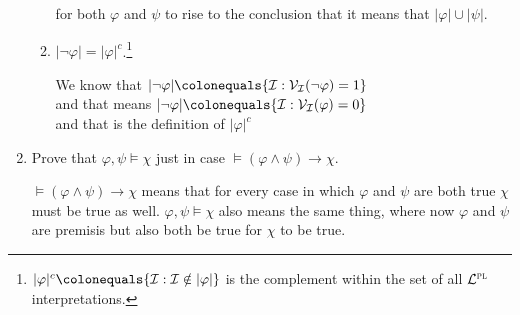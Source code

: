 \documentclass[12pt]{article}
\renewcommand{\vert}[1]{\lvert#1\rvert}
\newcommand{\set}[1]{\lbrace#1\rbrace} %
\newcommand{\I}{\mathcal{I}} %
\newcommand{\PL}{\mathcal{L}^{\textsc{pl}}} %
\newcommand{\V}[1]{\mathcal{V}_{#1}} %
\newcommand{\answer}[1]{%
  \par\noindent
  \begin{tcolorbox}[colback=gray!10, colframe=gray!80, title=Proof]
    #1
  \end{tcolorbox}
}
\begin{document}
\begin{enumerate}
\begin{enumerate}
{          for both $\varphi$ and $\psi$ to rise to the conclusion that it means that $\vert{\varphi} \cup \vert{\psi}$.
        }
      \item $\vert{\neg \varphi} = \vert{\varphi}^c$.\footnote{$\vert{\varphi}^c \colonequals \set{\I : \I \notin \vert{\varphi}}$ is the complement within the set of all $\PL$ interpretations.}
        \answer{
          We know that $\vert{\lnot \varphi} \colonequals \set{\I : \V{\I}(\lnot \varphi) = 1}$ \\
          and that means $\vert{\lnot \varphi} \colonequals \set{\I : \V{\I}(\varphi) = 0}$ \\
          and that is the definition of $\vert{\varphi}^c$
        }
    \end{enumerate}
  \item Prove that $\varphi, \psi \vDash \chi$ just in case $\vDash (\varphi \wedge \psi) \rightarrow \chi$. 
    \answer{
      $\vDash (\varphi \wedge \psi) \rightarrow \chi$ means that for every case in which $\varphi$ and  $\psi$ are both true
      $\chi$ must be true as well. $\varphi, \psi \vDash \chi$ also means the same thing, where now $\varphi$ and $\psi$ are
      premisis but also both be true for $\chi$ to be true.
    }
\end{enumerate}
\end{document}
